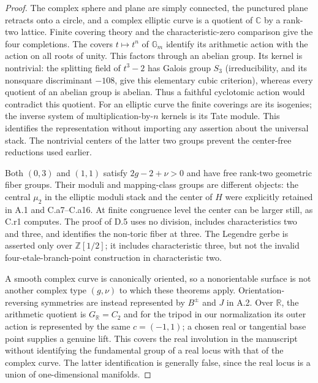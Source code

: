 \begin{proof}
The complex sphere and plane are simply connected, the punctured plane
retracts onto a circle, and a complex elliptic curve is a quotient of
$\mathbb C$ by a rank-two lattice. Finite covering theory and the
characteristic-zero comparison give the four completions. The covers
$t\mapsto t^n$ of $\mathbb G_m$ identify its arithmetic action with
the action on all roots of unity. This factors through an abelian group.
Its kernel is nontrivial: the splitting field of $t^3-2$ has Galois
group $S_3$ (irreducibility, and its nonsquare discriminant $-108$,
give this elementary cubic criterion), whereas every quotient of an
abelian group is abelian. Thus a faithful cyclotomic action would
contradict this quotient. For an elliptic curve the finite coverings
are its isogenies; the inverse system of multiplication-by-$n$ kernels
is its Tate module. This identifies the representation without importing
any assertion about the universal stack. The nontrivial centers of
the latter two groups prevent the center-free reductions used earlier.

Both $(0,3)$ and $(1,1)$ satisfy $2g-2+\nu>0$ and have free rank-two
geometric fiber groups. Their moduli and mapping-class groups are
different objects: the central $\mu_2$ in the elliptic moduli stack
and the center of $H$ were explicitly retained in A.1 and C.a7--C.a16.
At finite congruence level the center can be larger still, as C.r1
computes. The proof of D.5 uses no division, includes characteristics
two and three, and identifies the non-toric fiber at three. The Legendre
gerbe is asserted only over $\mathbb Z[1/2]$; it includes characteristic
three, but not the invalid four-etale-branch-point construction in
characteristic two.

A smooth complex curve is canonically oriented, so a nonorientable
surface is not another complex type $(g,\nu)$ to which these theorems
apply. Orientation-reversing symmetries are instead represented by
$B^\pm$ and $J$ in A.2. Over $\mathbb R$, the arithmetic quotient is
$G_\mathbb R=C_2$ and for the tripod in our normalization its outer action is represented
by the same $c=(-1,1)$; a chosen real or tangential base point supplies a genuine
lift. This covers the real involution in the manuscript without
identifying the fundamental group of a real locus with that of the
complex curve. The latter identification is generally false, since
the real locus is a union of one-dimensional manifolds.
\end{proof}

